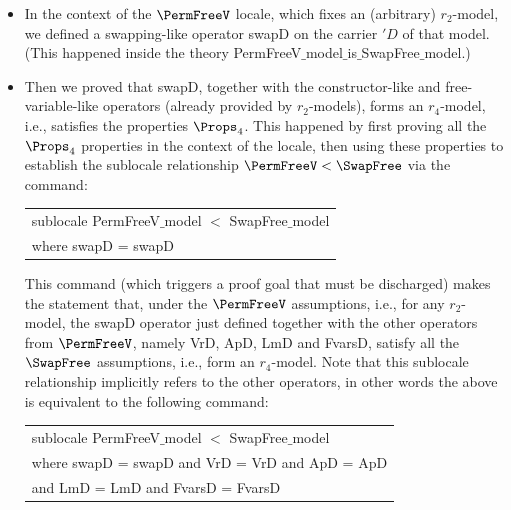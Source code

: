 \begin{itemize}
\begin{itemize} 
      \item In the context of the $\PermFreeV$ locale, which fixes an (arbitrary) $r_2$-model, we defined a swapping-like operator \textsf{swapD} on the carrier $'D$ of that model. (This happened inside the theory \textsf{PermFreeV$\_$\allowbreak{}model$\_$\allowbreak{}is$\_$\allowbreak{}SwapFree$\_$\allowbreak{}model}.) 
      \item Then we proved that \textsf{swapD}, together with the constructor-like and free-variable-like operators (already provided by $r_2$-models), forms an $r_4$-model, i.e., satisfies the  properties $\Props_4$. This happened by first proving all the $\Props_4$ properties in the context of the locale, then using these properties to establish the sublocale relationship $\PermFreeV < \SwapFree$ via the command:
      
\begin{center}
	\begin{tabular}{l}
\textsf{sublocale PermFreeV$\_$\allowbreak{}model $<$ SwapFree$\_$\allowbreak{}model}
\\
\textsf{where swapD = swapD}
\end{tabular} 
\end{center} 

This command (which triggers a proof goal that must be discharged) 
makes the statement that, under the $\PermFreeV$ 
assumptions, i.e., for any $r_2$-model, 
the \textsf{swapD} operator just defined together with the other operators from $\PermFreeV$, 
namely \textsf{VrD}, \textsf{ApD}, \textsf{LmD} and \textsf{FvarsD}, satisfy all the $\SwapFree$ assumptions, i.e., form an 
$r_4$-model. Note that this sublocale relationship implicitly refers to the other operators, in 
other words the above is equivalent to the following command: 

\begin{center}
	\begin{tabular}{l}
		\textsf{sublocale PermFreeV$\_$\allowbreak{}model $<$ SwapFree$\_$\allowbreak{}model}
		\\
		\textsf{where swapD = swapD and VrD = VrD and ApD = ApD} 
		\\
		\textsf{and LmD = LmD and FvarsD = FvarsD}
	\end{tabular} 
\end{center} 


\end{itemize}
\end{itemize}

